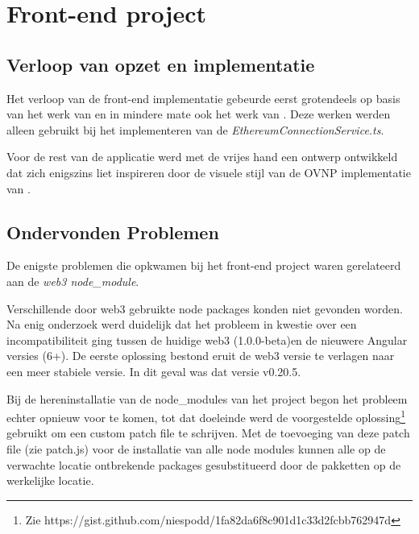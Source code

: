 \section{Front-end project}
	\subsection{Verloop van opzet en implementatie}
	Het verloop van de front-end implementatie gebeurde eerst grotendeels op basis van het werk van \textcite{Ranjan2018} en
	in mindere mate ook het werk van \textcite{McCubin2019}. Deze werken werden alleen gebruikt bij het implementeren van de \textit{EthereumConnectionService.ts}. 
	
	Voor de rest van de applicatie werd met de vrijes hand een ontwerp ontwikkeld dat zich enigszins liet inspireren door de visuele stijl van de OVNP implementatie van \textcite{McCorry2017}.
	\subsection{Ondervonden Problemen}
	De enigste problemen die opkwamen bij het front-end project waren gerelateerd aan de \textit{web3 node\_module}. 
	
	Verschillende door web3 gebruikte node packages konden niet gevonden worden. Na enig onderzoek werd duidelijk dat het probleem in kwestie over een incompatibiliteit ging tussen de huidige web3 (1.0.0-beta)en de nieuwere Angular versies (6+). De  eerste oplossing bestond eruit de web3 versie te verlagen naar een meer stabiele versie. In dit geval was dat  versie v0.20.5. 
	
	Bij de hereninstallatie van de node\_modules van het project begon het probleem echter opnieuw voor te komen, tot dat doeleinde werd de voorgestelde oplossing\footnote{Zie https://gist.github.com/niespodd/1fa82da6f8c901d1c33d2fcbb762947d} gebruikt om een custom patch file te schrijven. Met de toevoeging van deze patch file (zie patch.js) voor de installatie van alle node modules kunnen alle op de verwachte locatie ontbrekende packages gesubstitueerd door de pakketten op de werkelijke locatie.
	
	

